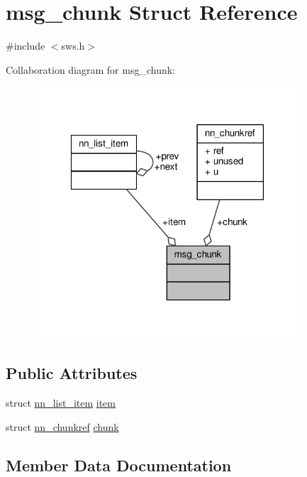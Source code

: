 \hypertarget{structmsg__chunk}{}\section{msg\+\_\+chunk Struct Reference}
\label{structmsg__chunk}


{\ttfamily \#include $<$sws.\+h$>$}



Collaboration diagram for msg\+\_\+chunk\+:\nopagebreak
\begin{figure}[H]
\begin{center}
\leavevmode
\includegraphics[width=283pt]{structmsg__chunk__coll__graph}
\end{center}
\end{figure}
\subsection*{Public Attributes}
\begin{DoxyCompactItemize}
\item 
struct \hyperlink{structnn__list__item}{nn\+\_\+list\+\_\+item} \hyperlink{structmsg__chunk_a6213f0c7d69f12c92c6b93128940ec3d}{item}
\item 
struct \hyperlink{structnn__chunkref}{nn\+\_\+chunkref} \hyperlink{structmsg__chunk_a001988b0b2d95416966e7f2fe1655f78}{chunk}
\end{DoxyCompactItemize}


\subsection{Member Data Documentation}
